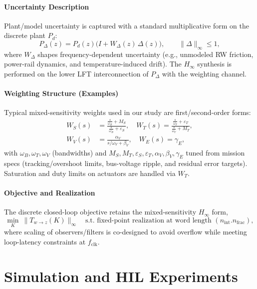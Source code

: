 \documentclass[conference]{IEEEtran}
\begin{document}
\paragraph*{Uncertainty Description}
Plant/model uncertainty is captured with a standard multiplicative form on the
discrete plant $P_d$:
\[
P_\Delta(z)=P_d(z)\big(I+W_\Delta(z)\,\Delta(z)\big),\qquad \|\Delta\|_\infty\le 1,
\]
where $W_\Delta$ shapes frequency-dependent uncertainty (e.g., unmodeled RW
friction, power-rail dynamics, and temperature-induced drift). The
$H_\infty$ synthesis is performed on the lower LFT interconnection of
$P_\Delta$ with the weighting channel.

\paragraph*{Weighting Structure (Examples)}
Typical mixed-sensitivity weights used in our study are first/second-order forms:
\[
\begin{aligned}
W_S(s) &= \frac{\tfrac{s}{\omega_B}+M_S}{\tfrac{s}{\omega_B}+\varepsilon_S},\quad
W_T(s) = \frac{\tfrac{s}{\omega_T}+\varepsilon_T}{\tfrac{s}{\omega_T}+M_T},\\
W_V(s) &= \frac{\alpha_V}{s/\omega_V + \beta_V},\quad
W_E(s)=\gamma_E,
\end{aligned}
\]
with $\omega_B,\omega_T,\omega_V$ (bandwidths) and $M_S,M_T,\varepsilon_S,\varepsilon_T,
\alpha_V,\beta_V,\gamma_E$ tuned from mission specs (tracking/overshoot limits,
bus-voltage ripple, and residual error targets). Saturation and duty limits on
actuators are handled via $W_T$.

\paragraph*{Objective and Realization}
The discrete closed-loop objective retains the mixed-sensitivity $H_\infty$ form,
\begin{equation}
\min_K\ \big\|T_{w\to z}(K)\big\|_\infty \quad
\text{s.t. fixed-point realization at word length } (n_\mathrm{int}.n_\mathrm{frac}),
\label{eq:objective}
\end{equation}
where scaling of observers/filters is co-designed to avoid overflow while
meeting loop-latency constraints at $f_\mathrm{clk}$.

\section{Simulation and HIL Experiments}
\end{document}
